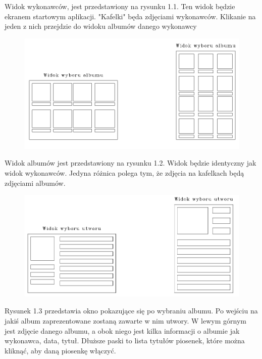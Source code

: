 Widok wykonawców, jest przedstawiony na rysunku 1.1. Ten widok będzie ekranem startowym aplikacji. "Kafelki" będa zdjęciami wykonawców. Klikanie na jeden z nich przejdzie do widoku albumów danego wykonawcy

\begin{figure}[H]
	\centering
	\includegraphics[width=1\linewidth]{images/mockup2_albumy}
	\caption{}
	\label{fig:mockup2albumy}
\end{figure}


Widok albumów jest przedstawiony na rysunku 1.2. Widok będzie identyczny jak widok wykonawców. Jedyna różnica polega tym, że zdjęcia na kafelkach będą zdjęciami albumów.

\begin{figure}[H]
	\centering
	\includegraphics[width=1\linewidth]{images/mockup2_utwory}
	\caption{}
	\label{fig:mockup2utwory}
\end{figure}


Rysunek 1.3 przedstawia okno pokazujące się po wybraniu albumu. Po wejściu na jakiś album zaprezentowane zostaną zawarte w nim utwory. W lewym górnym jest zdjęcie danego albumu, a obok niego jest kilka informacji o albumie jak wykonawca, data, tytuł. Dłuższe paski to lista tytułów piosenek, które można kliknąć, aby daną piosenkę włączyć.


